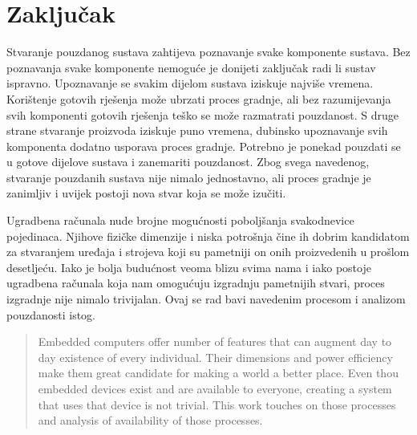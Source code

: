 \documentclass[times, utf8, diplomski]{diplomski}
\begin{document}
\chapter{Zaključak}
Stvaranje pouzdanog sustava zahtijeva poznavanje svake komponente sustava.
Bez poznavanja svake komponente nemoguće je donijeti zaključak radi li sustav ispravno.
Upoznavanje se svakim dijelom sustava iziskuje najviše vremena.
Korištenje gotovih rješenja može ubrzati proces gradnje, ali bez razumijevanja svih komponenti gotovih rješenja teško se može razmatrati pouzdanost.
S druge strane stvaranje proizvoda iziskuje puno vremena, dubinsko upoznavanje svih komponenta dodatno usporava proces gradnje.
Potrebno je ponekad pouzdati se u gotove dijelove sustava i zanemariti pouzdanost.
Zbog svega navedenog, stvaranje pouzdanih sustava nije nimalo jednostavno, ali proces gradnje je zanimljiv i uvijek postoji nova stvar koja se može izučiti.

\nocite{*}



\listoffigures

\lstlistoflistings


\begin{sazetak}
Ugradbena računala nude brojne mogućnosti poboljšanja svakodnevice pojedinaca. Njihove fizičke dimenzije i niska potrošnja čine ih dobrim kandidatom za stvaranjem uređaja i strojeva koji su pametniji on onih proizvedenih u prošlom desetljeću. Iako je bolja budućnost veoma blizu svima nama i iako postoje ugradbena računala koja nam omogućuju izgradnju pametnijih stvari, proces izgradnje nije nimalo trivijalan. Ovaj se rad bavi navedenim procesom i analizom pouzdanosti istog.

\end{sazetak}


\begin{abstract}
Embedded computers offer number of features that can augment day to day existence of every individual. Their dimensions and power efficiency make them great candidate for making a world a better place. Even thou embedded devices exist and are available to everyone, creating a system that uses that device is not trivial. This work touches on those processes and analysis of availability of those processes.

\end{abstract}
\end{document}
